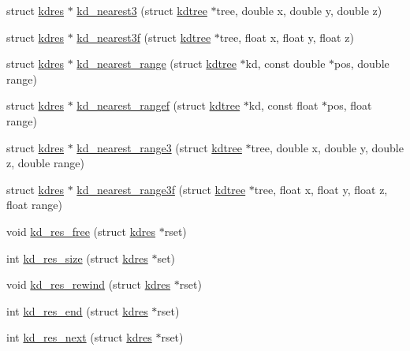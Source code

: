 \begin{DoxyCompactItemize}
\item 
struct \hyperlink{a00010}{kdres} $\ast$ \hyperlink{a00013_ad5d009b99e7804547508048f49b79d30_ad5d009b99e7804547508048f49b79d30}{kd\-\_\-nearest3} (struct \hyperlink{a00011}{kdtree} $\ast$tree, double x, double y, double z)
\item 
struct \hyperlink{a00010}{kdres} $\ast$ \hyperlink{a00013_a9811ac60c0e418bd5d0537e3a3568b6f_a9811ac60c0e418bd5d0537e3a3568b6f}{kd\-\_\-nearest3f} (struct \hyperlink{a00011}{kdtree} $\ast$tree, float x, float y, float z)
\item 
struct \hyperlink{a00010}{kdres} $\ast$ \hyperlink{a00013_a09a358026da74679e3704c7f815541db_a09a358026da74679e3704c7f815541db}{kd\-\_\-nearest\-\_\-range} (struct \hyperlink{a00011}{kdtree} $\ast$kd, const double $\ast$pos, double range)
\item 
struct \hyperlink{a00010}{kdres} $\ast$ \hyperlink{a00013_aa78fd42b8fe94f37a13bfc07cd5e613f_aa78fd42b8fe94f37a13bfc07cd5e613f}{kd\-\_\-nearest\-\_\-rangef} (struct \hyperlink{a00011}{kdtree} $\ast$kd, const float $\ast$pos, float range)
\item 
struct \hyperlink{a00010}{kdres} $\ast$ \hyperlink{a00013_a205361bbf9b2378819b17a1e101c1d23_a205361bbf9b2378819b17a1e101c1d23}{kd\-\_\-nearest\-\_\-range3} (struct \hyperlink{a00011}{kdtree} $\ast$tree, double x, double y, double z, double range)
\item 
struct \hyperlink{a00010}{kdres} $\ast$ \hyperlink{a00013_a31785d1b48d785e7c8f178a40671d4f4_a31785d1b48d785e7c8f178a40671d4f4}{kd\-\_\-nearest\-\_\-range3f} (struct \hyperlink{a00011}{kdtree} $\ast$tree, float x, float y, float z, float range)
\item 
void \hyperlink{a00013_a0455428d163f82decaecee4b2634f523_a0455428d163f82decaecee4b2634f523}{kd\-\_\-res\-\_\-free} (struct \hyperlink{a00010}{kdres} $\ast$rset)
\item 
int \hyperlink{a00013_adb070dde37e9a978f231d730b7a24b53_adb070dde37e9a978f231d730b7a24b53}{kd\-\_\-res\-\_\-size} (struct \hyperlink{a00010}{kdres} $\ast$set)
\item 
void \hyperlink{a00013_a929a839b9fbdf7301fd0a0b6500bbf64_a929a839b9fbdf7301fd0a0b6500bbf64}{kd\-\_\-res\-\_\-rewind} (struct \hyperlink{a00010}{kdres} $\ast$rset)
\item 
int \hyperlink{a00013_aeeb3d7c8f548d0f9f91679fe819aa0ca_aeeb3d7c8f548d0f9f91679fe819aa0ca}{kd\-\_\-res\-\_\-end} (struct \hyperlink{a00010}{kdres} $\ast$rset)
\item 
int \hyperlink{a00013_a83b3badfed2a9a1bf6f36bb69542f2c3_a83b3badfed2a9a1bf6f36bb69542f2c3}{kd\-\_\-res\-\_\-next} (struct \hyperlink{a00010}{kdres} $\ast$rset)

\end{DoxyCompactItemize}
